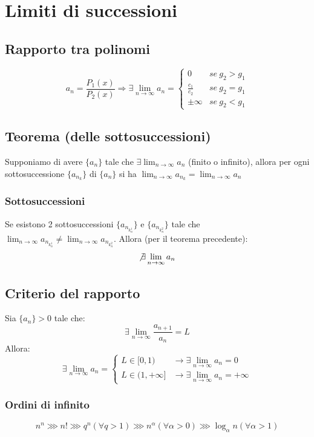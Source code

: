 \section{Limiti di successioni}
\subsection{Rapporto tra polinomi}
\begin{equation}
    a_n = \frac{P_1(x)}{P_2(x)} \Longrightarrow \exists\lim_{n\rightarrow\infty} a_n = 
    \begin{cases}
        0 & se\ g_2 > g_1\\
        \frac{c_1}{c_2} & se\ g_2 = g_1\\
        \pm\infty & se\ g_2 < g_1
    \end{cases}
\end{equation}

\subsection{Teorema (delle sottosuccessioni)}
Supponiamo di avere $\{a_n\}$ tale che $\exists\lim_{n\rightarrow\infty}a_n$ (finito o infinito), allora per ogni sottosuccessione $\{a_{n_k}\}$ di $\{a_n\}$ si ha $\lim_{n\rightarrow\infty}a_{n_k} = \lim_{n\rightarrow\infty}a_n$

\subsubsection{Sottosuccessioni}
Se esistono 2 sottosuccessioni $\{a_{n_{k_n^1}}\}$ e $\{a_{n_{k_n^2}}\}$ tale che $\lim_{n\rightarrow\infty}a_{n_{k_n^1}} \not = \lim_{n\rightarrow\infty}a_{n_{k_n^2}}$. Allora (per il teorema precedente):
\begin{equation}
    \not\exists\lim_{n\rightarrow\infty}a_n
\end{equation}

\subsection{Criterio del rapporto}
Sia $\{a_n\} > 0$ tale che:
\begin{equation}
    \exists\lim_{n\rightarrow\infty}\frac{a_{n+1}}{a_n} = L
\end{equation}
Allora:
\begin{equation}
    \exists\lim_{n\rightarrow\infty} a_n = 
    \begin{cases}
        L \in [0, 1) & \rightarrow \exists\lim_{n\rightarrow\infty} a_n = 0 \\ 
        L \in (1, +\infty] & \rightarrow \exists\lim_{n\rightarrow\infty} a_n = +\infty
    \end{cases}
\end{equation}

\subsubsection{Ordini di infinito}
\begin{equation}
    n^n \ggg n! \ggg q^n (\forall q>1) \ggg n^\alpha (\forall\alpha > 0) \ggg \log_\alpha n (\forall\alpha>1)
\end{equation}
